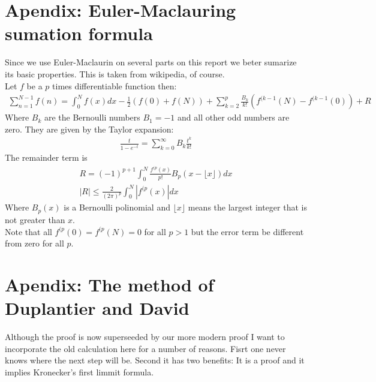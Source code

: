 \documentclass[12pt]{article}
\begin{document}
\section{Apendix: Euler-Maclauring sumation formula}
Since we use Euler-Maclaurin on several parts on this report we beter sumarize its basic properties. This is taken from wikipedia, of course.\\
Let $f$ be a $p$ times differentiable function then:
\begin{gather}
\sum_{n=1}^{N-1} f(n)=\int_0^N f(x)dx-\frac{1}{2}\left(f(0)+f(N)\right)+\sum_{k=2}^p\frac{B_k}{k!}\left(f^{(k-1}(N)-f^{(k-1}(0)\right)+R
\end{gather}
Where $B_k$ are the Bernoulli numbers $B_1=-1$ and all other odd numbers are zero. They are given by the Taylor expansion:
\begin{gather}
\frac{t}{1-e^{-t}}=\sum_{k=0}^\infty B_k \frac{t^k}{k!}
\end{gather}
The remainder term is
\begin{gather}
R=(-1)^{p+1}\int_0^N \frac{f^{(p}(x)}{p!}B_p(x-\lfloor x\rfloor)dx\\
|R|\leq \frac{2}{(2\pi)^p}\int_0^N\left| f^{(p}(x)\right| dx
\end{gather}
Where $B_p(x)$ is a Bernoulli polinomial and $\lfloor x\rfloor$ means the largest integer that is not greater than $x$.\\
Note that all $f^{(p}(0)=f^{(p}(N)=0$ for all $p>1$ but the error term be different from zero for all $p$.
\section{Apendix: The method of Duplantier and David}
Although the proof is now superseeded by our more modern proof I want to incorporate the old calculation here for a number of reasons.
Fisrt one never knows where the next step will be. Second it has two benefits: It is a proof and it implies Kronecker's first limmit formula.
\end{document}
